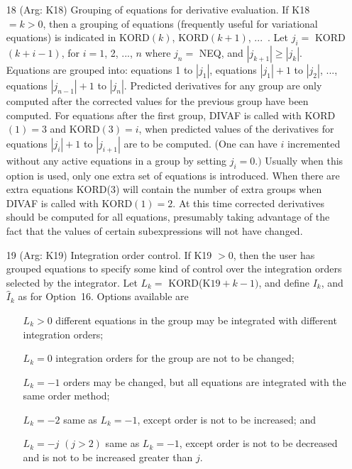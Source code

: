 \documentclass[twoside]{MATH77}
\begin{document}
\begin{itemize}
\item[18]  (Arg: K18) Grouping of equations for derivative evaluation. If
K18 $=k>0$, then a grouping of equations (frequently useful for variational
equations) is indicated in KORD$(k)$, KORD$(k+1)$, ...~. Let $j_i=$ KORD$%
(k+i-1)$, for $i=1$, 2, ..., $n$ where $j_n=$ NEQ, and $|j_{k+1}|\geq |j_k|$.
Equations are grouped into: equations 1 to $|j_1|$, equations $|j_1|+1$
to $|j_2|$, ..., equations $|j_{n-1}|+1$ to $|j_n|$. Predicted derivatives for
any group are only computed after the corrected values for the previous
group have been computed. For equations after the first group, DIVAF is
called with KORD$(1)=3$ and KORD$(3)=i$, when predicted values of the
derivatives for equations $|j_i|+1$ to $|j_{i+1}|$ are to be computed. (One
can have $i$ incremented without any active equations in a group by setting $%
j_i=0.)$ Usually when this option is used, only one extra set of equations
is introduced. When there are extra equations KORD(3) will contain the
number of extra groups when DIVAF is called with KORD$(1)=2$. At this time
corrected derivatives should be computed for all equations, presumably
taking advantage of the fact that the values of certain subexpressions will
not have changed.

\item[19]  (Arg: K19) Integration order control. If K19 $>0$, then the user
has grouped equations to specify some kind of control over the integration
orders selected by the integrator. Let $L_k =$ KORD($\text{K19}+k-1)$,
and define $I_k$, and $\hat I_k$  as for Option~16. Options available are

\begin{itemize}
\item[$L_k>0$]  different equations in the group may be integrated with
different integration orders;

\item[$L_k=0$]  integration orders for the group are not to be changed;

\item[$L_k=-1$]  orders may be changed, but all equations are integrated
with the same order method;

\item[$L_k=-2$]  same as $L_k=-1$, except order is not to be increased; and

\item[$L_k=-j$]  $(j>2)$ same as $L_k=-1$, except order is not to be
decreased and is not to be increased greater than $j.$
\end{itemize}


\end{itemize}
\end{document}
